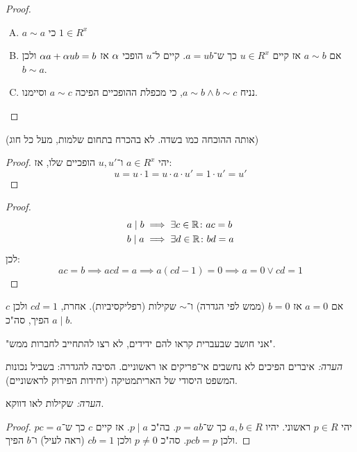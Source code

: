 \documentclass[]{../../../../tex/classes/styledArticle}
\begin{document}
	\begin{proof}
		\begin{enumerate}[A.]
			\item $a \sim a$ כי $1 \in R^x$
			\item אם $a \sim b$ אז קיים $u \in R^x$ כך ש־$a = ub$. קיים ל־$u$ הופכי $\alpha$ אז $\alpha a + \alpha u b = b$ ולכן $b \sim a$. 
			\item נניח $a \sim b \land b \sim c$, כי מכפלת ההופכיים הפיכה $a \sim c$ וסיימנו. 
		\end{enumerate}
	\end{proof}
	 (אותה ההוכחה כמו בשדה. לא בהכרח בתחום שלמות, מעל כל חוג)\begin{proof}
				יהי $a \in R^x$ ו־$u, u'$ הופכיים שלו, אז:
		\[ u = u \cdot 1 = u \cdot a \cdot u' = 1 \cdot u' = u' \]
	\end{proof}
	\begin{proof}
		\begin{align*}
			a \mid b &\implies \exists c \in \mathbb{R} \colon ac = b \\
			b \mid a &\implies \exists d \in \mathbb{R}\colon bd = a
		\end{align*}
		לכן: 
		\[ ac = b \implies acd = a \implies a(cd - 1) = 0 \implies a = 0 \lor cd = 1 \]
	\end{proof}
	אם $a = 0$ אז $b = 0$ (ממש לפי הגדרה) ו־$\sim$ שקילות (רפליקסיביות). אחרת, $cd = 1$ ולכן $c$ הפיך, סה"כ $a \mid b$. 
	
	"אני חושב שבעברית קראו להם ידידים, לא רצו להתחייב לחברות ממש". 
	
	
	
	\textit{הערה: }איברים הפיכים לא נחשבים אי־פריקים או ראשוניים. הסיבה להגדרה: בשביל נכונות המשפט היסודי של האריתמטיקה (יחידות הפירוק לראשוניים). 
	
	\textit{הערה: }שקילות לאו דווקא. 
	\begin{proof}
		יהי $p \in R$ ראשוני. יהיו $a, b \in R$ כך ש־$p = ab$. בה"כ $p \mid a$. אז קיים $c$ כך ש־$pc = a$ ולכן $pcb = p$. סה"כ $p \neq 0$ ולכן $cb = 1$ (ראה לעיל) ו־$b$ הפיך. 
	\end{proof}
	
\end{document}

